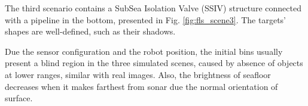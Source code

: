 \documentclass[final,5p,times]{elsarticle}
\begin{document}
The third scenario contains a SubSea Isolation Valve (SSIV) structure connected with a pipeline in the bottom, presented in Fig. \ref{fig:fls_scene3}. The targets' shapes are well-defined, such as their shadows.

Due the sensor configuration and the robot position, the initial bins usually present a blind region in the three simulated scenes, caused by absence of objects at lower ranges, similar with real images. Also, the brightness of seafloor decreases when it makes farthest from sonar due the normal orientation of surface.

\begin{figure}[!ht]
    \centering
\end{figure}
\end{document}
